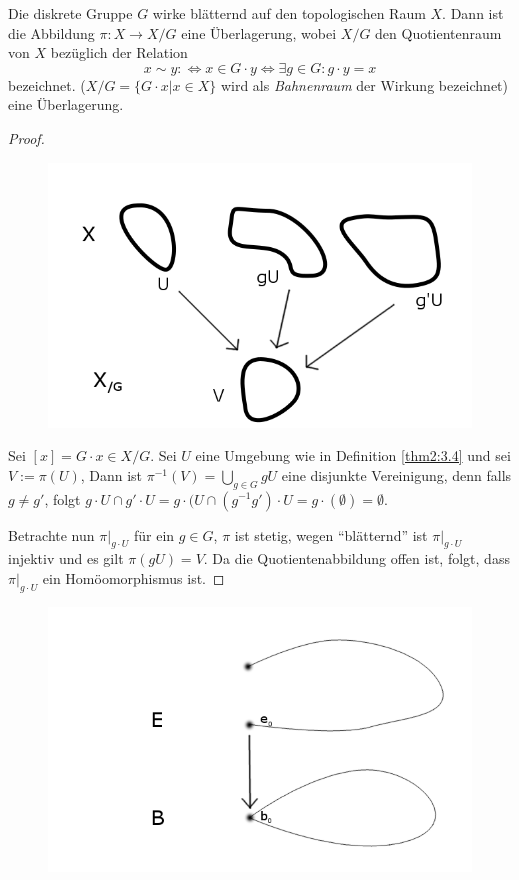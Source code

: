 \documentclass[a4paper,10pt]{scrartcl}
\begin{document}
\begin{lem}\label{thm2:3.5}
 Die diskrete Gruppe $G$ wirke blätternd auf den topologischen Raum $X$. Dann ist die Abbildung $\pi: X\to X/G$ eine Überlagerung, wobei $X/G$ den Quotientenraum von $X$ bezüglich der Relation
\[
 x\sim y :\iff x\in G\cdot y \iff \exists g\in G: g\cdot y=x
\]
bezeichnet. ($X/G=\{G\cdot x|x\in X\}$ wird als \emph{Bahnenraum} der Wirkung bezeichnet) eine Überlagerung.


\end{lem}
\begin{proof}
\begin{figure}[H]
\centering
\includegraphics[scale=0.3]{fig76.png} 
\caption{}
\end{figure}
 Sei $[x]=G\cdot x\in X/G$. Sei $U$ eine Umgebung wie in Definition \ref{thm2:3.4} und sei $V:=\pi(U)$, Dann ist $\pi^{-1}(V)=\bigcup_{g\in G} gU$ eine disjunkte Vereinigung, denn falls $g\neq g'$, folgt $g\cdot U \cap g'\cdot U=g\cdot (U\cap(g^{-1}g') \cdot U =g\cdot(\emptyset)=\emptyset$.

Betrachte nun $\pi|_{g\cdot U}$ für ein $g\in G$, $\pi$ ist stetig, wegen "`blätternd"' ist $\pi|_{g\cdot U}$ injektiv und es gilt $\pi(gU)=V$.
Da die Quotientenabbildung offen ist, folgt, dass  $\pi|_{g\cdot U}$ ein Homöomorphismus ist.
\end{proof}
\begin{figure}[H]
\centering
\includegraphics[scale=0.3]{fig77.png} 
\caption{}
\end{figure}
\end{document}
